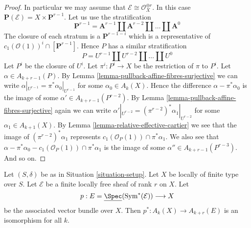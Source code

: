 \begin{proof}
\medskip\noindent
In particular we may assume that $\mathcal{E} \cong \mathcal{O}_X^{\oplus r}$.
In this case $\mathbf{P}(\mathcal{E}) = X \times \mathbf{P}^{r - 1}$.
Let us use the stratification
$$
\mathbf{P}^{r - 1} = \mathbf{A}^{r - 1}
\amalg \mathbf{A}^{r - 2}
\amalg \ldots
\amalg \mathbf{A}^0
$$
The closure of each stratum is a $\mathbf{P}^{r - 1 - i}$ which is a
representative of $c_1(\mathcal{O}(1))^i \cap [\mathbf{P}^{r - 1}]$.
Hence $P$ has a similar stratification
$$
P = U^{r - 1} \amalg U^{r - 2} \amalg \ldots \amalg U^0
$$
Let $P^i$ be the closure of $U^i$. Let $\pi^i : P^i \to X$
be the restriction of $\pi$ to $P^i$.
Let $\alpha \in A_{k + r - 1}(P)$. By
Lemma \ref{lemma-pullback-affine-fibres-surjective}
we can write $\alpha|_{U^{r - 1}} = \pi^*\alpha_0|_{U^{r - 1}}$
for some $\alpha_0 \in A_k(X)$. Hence the difference
$\alpha - \pi^*\alpha_0$ is the image of some
$\alpha' \in A_{k + r - 1}(P^{r - 2})$.
By Lemma \ref{lemma-pullback-affine-fibres-surjective}
again we can write
$\alpha'|_{U^{r - 2}} = (\pi^{r - 2})^*\alpha_1|_{U^{r - 2}}$
for some $\alpha_1 \in A_{k + 1}(X)$.
By Lemma \ref{lemma-relative-effective-cartier}
we see that the image of $(\pi^{r - 2})^*\alpha_1$
represents $c_1(\mathcal{O}_P(1)) \cap \pi^*\alpha_1$.
We also see that
$\alpha - \pi^*\alpha_0 - c_1(\mathcal{O}_P(1)) \cap \pi^*\alpha_1$
is the image of some $\alpha'' \in A_{k + r - 1}(P^{r - 3})$.
And so on.
\end{proof}

\begin{lemma}
\label{lemma-vectorbundle}
Let $(S, \delta)$ be as in Situation \ref{situation-setup}.
Let $X$ be locally of finite type over $S$.
Let $\mathcal{E}$ be a finite locally free sheaf of rank $r$ on $X$.
Let
$$
p :
E = \underline{\Spec}(\text{Sym}^*(\mathcal{E}))
\longrightarrow
X
$$
be the associated vector bundle over $X$.
Then $p^* : A_k(X) \to A_{k + r}(E)$ is an isomorphism for all $k$.
\end{lemma}


